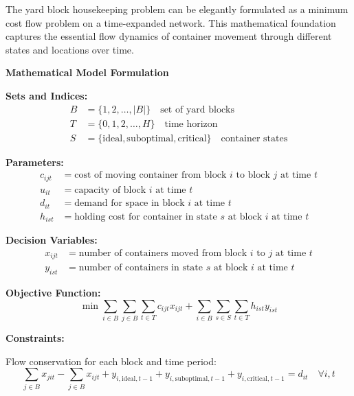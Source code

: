 \documentclass{article}
\begin{document}
The yard block housekeeping problem can be elegantly formulated as a minimum cost flow problem on a time-expanded network. This mathematical foundation captures the essential flow dynamics of container movement through different states and locations over time.

\textbf{Mathematical Model Formulation}

\textbf{Sets and Indices:}
\begin{align}
B &= \{1, 2, \ldots, |B|\} \quad \text{set of yard blocks} \\
T &= \{0, 1, 2, \ldots, H\} \quad \text{time horizon} \\
S &= \{\mathrm{ideal}, \mathrm{suboptimal}, \mathrm{critical}\} \quad \text{container states}
\end{align}

\textbf{Parameters:}
\begin{align}
c_{ijt} &= \text{cost of moving container from block } i \text{ to block } j \text{ at time } t \\
u_{it} &= \text{capacity of block } i \text{ at time } t \\
d_{it} &= \text{demand for space in block } i \text{ at time } t \\
h_{ist} &= \text{holding cost for container in state } s \text{ at block } i \text{ at time } t
\end{align}

\textbf{Decision Variables:}
\begin{align}
x_{ijt} &= \text{number of containers moved from block } i \text{ to } j \text{ at time } t \\
y_{ist} &= \text{number of containers in state } s \text{ at block } i \text{ at time } t
\end{align}

\textbf{Objective Function:}
\begin{equation}
\min \sum_{i \in B} \sum_{j \in B} \sum_{t \in T} c_{ijt} x_{ijt} + \sum_{i \in B} \sum_{s \in S} \sum_{t \in T} h_{ist} y_{ist}
\end{equation}

\textbf{Constraints:}

Flow conservation for each block and time period:
\begin{equation}
\sum_{j \in B} x_{jit} - \sum_{j \in B} x_{ijt} + y_{i,\mathrm{ideal},t-1} + y_{i,\mathrm{suboptimal},t-1} + y_{i,\mathrm{critical},t-1} = d_{it} \quad \forall i, t
\end{equation}
\end{document}
